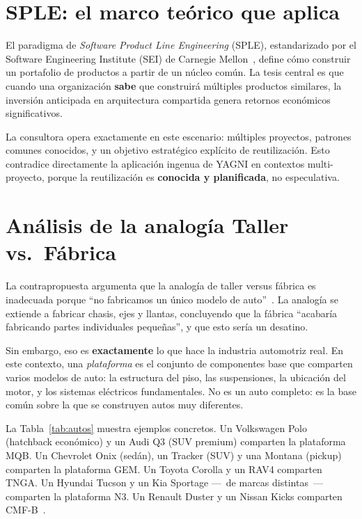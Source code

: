 \documentclass[conference]{IEEEtran}
\begin{document}
\section{SPLE: el marco te\'orico que aplica}

El paradigma de \textit{Software Product Line Engineering}
(SPLE), estandarizado por el Software Engineering Institute (SEI)
de Carnegie Mellon~\cite{clements2001}, define c\'omo construir un
portafolio de productos a partir de un n\'ucleo com\'un. La tesis
central es que cuando una organizaci\'on \textbf{sabe} que
construir\'a m\'ultiples productos similares, la inversi\'on
anticipada en arquitectura compartida genera retornos econ\'omicos
significativos.

La consultora opera exactamente en este escenario: m\'ultiples
proyectos, patrones comunes conocidos, y un objetivo estrat\'egico
expl\'icito de reutilizaci\'on. Esto contradice directamente la
aplicaci\'on ingenua de YAGNI en contextos multi-proyecto, porque
la reutilizaci\'on es \textbf{conocida y planificada}, no
especulativa.

\section{An\'alisis de la analog\'ia Taller vs.\ F\'abrica}

La contrapropuesta argumenta que la analog\'ia de taller versus
f\'abrica es inadecuada porque ``no fabricamos un \'unico modelo
de auto''~\cite{araoz2026}. La analog\'ia se extiende a fabricar
chasis, ejes y llantas, concluyendo que la f\'abrica
``acabar\'ia fabricando partes individuales peque\~nas'', y que
esto ser\'ia un desatino.

Sin embargo, eso es \textbf{exactamente} lo que hace la industria
automotriz real. En este contexto, una \textit{plataforma} es el
conjunto de componentes base que comparten varios modelos de auto:
la estructura del piso, las suspensiones, la ubicaci\'on del motor,
y los sistemas el\'ectricos fundamentales. No es un auto completo:
es la base com\'un sobre la que se construyen autos muy diferentes.

La Tabla~\ref{tab:autos} muestra ejemplos concretos. Un
Volkswagen Polo (hatchback econ\'omico) y un Audi Q3 (SUV
premium) comparten la plataforma MQB. Un Chevrolet Onix
(sed\'an), un Tracker (SUV) y una Montana (pickup) comparten la
plataforma GEM. Un Toyota Corolla y un RAV4 comparten TNGA. Un
Hyundai Tucson y un Kia Sportage ---~de marcas distintas~---
comparten la plataforma N3. Un Renault Duster y un Nissan Kicks
comparten CMF-B~\cite{vw_mqb, gm_gem, toyota_tnga,
hyundai_platform, renault_cmf}.
\end{document}
